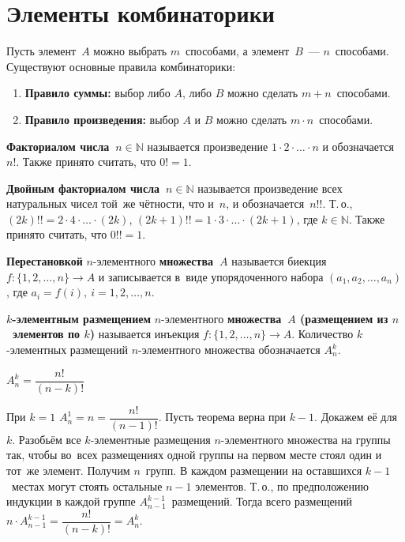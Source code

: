 \section{Элементы комбинаторики}
Пусть элемент~$A$ можно выбрать $m$~способами, а элемент~$B$~--- $n$~способами. Существуют основные правила комбинаторики:
\begin{enumerate}
	\item \textbf{Правило суммы:} выбор либо $A$, либо $B$ можно сделать $m + n$~способами.
	\item \textbf{Правило произведения:} выбор $A$ и $B$ можно сделать $m \cdot n$~способами.
\end{enumerate}

\index{!}  \textbf{Факториалом числа~$n \in \mathbb N$} называется произведение $1 \cdot 2 \cdot \ldots \cdot n$ и обозначается~$n!$.
Также принято считать, что $0! = 1$.

\textbf{Двойным факториалом числа~$n \in \mathbb N$} называется произведение всех натуральных чисел той~же чётности, что и~$n$, и обозначается~$n!!$.
Т.\,о., $(2k)!! = 2 \cdot 4 \cdot \ldots \cdot (2k)$, $(2k + 1)!! = 1 \cdot 3 \cdot \ldots \cdot (2k + 1)$, где $k \in \mathbb N$.
Также принято считать, что $0!! = 1$.

 \textbf{Перестановкой} $n$-элементного \textbf{множества~$A$} называется биекция $f \colon \{ 1, 2, \ldots, n \} \to A$ и записывается в~виде упорядоченного набора $(a_1, a_2, \ldots, a_n)$, где $a_i = f(i), \ i = 1, 2, \ldots, n$.

 \textbf{$k$-элементным размещением} $n$-элементного \textbf{множества~$A$ (размещением из $n$~элементов по $k$)} называется инъекция $f \colon \{ 1, 2, \ldots, n \} \to A$.
Количество $k$-элементных размещений $n$-элементного множества обозначается $A_n^k$.

\begin{statement}
$A_n^k = \dfrac{n!}{(n - k)!}$
\end{statement}
\begin{proofmathind}
	\indbase При $k = 1$ $A_n^1 = n = \dfrac{n!}{(n - 1)!}$.
	\indstep Пусть теорема верна при $k - 1$.
	Докажем её для $k$.
	Разобьём все $k$\nobreakdash-\hspace{0pt}элементные размещения $n$\nobreakdash-\hspace{0pt}элементного множества на группы так, чтобы во~всех размещениях одной группы на первом месте стоял один и тот~же элемент.
	Получим $n$~групп.
	В каждом размещении на оставшихся $k - 1$~местах могут стоять остальные $n - 1$ элементов.
	Т.\,о., по предположению индукции в каждой группе $A_{n-1}^{k-1}$~размещений.
	Тогда всего размещений $n \cdot A_{n-1}^{k-1} = \dfrac{n!}{(n - k)!} = A_n^k$. \indend
\end{proofmathind}

